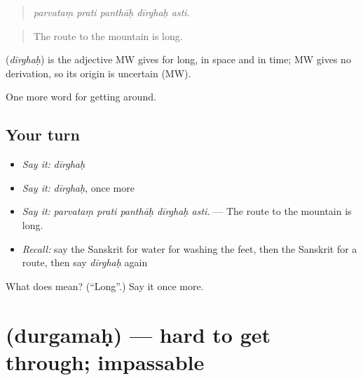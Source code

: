 \begin{quote}
    
\end{quote}

\begin{quote}
\emph{parvataṃ prati panthāḥ dīrghaḥ asti.}
\end{quote}

\begin{quote}
The route to the mountain is long.
\end{quote}

\begin{cousinweb}
\textbf{} (\emph{dīrghaḥ}) is the adjective MW gives for long, in space and in time; MW gives no derivation, so its origin is uncertain (MW).
\end{cousinweb}

\begin{grammarlens}[title={What you've built}]
One more word for getting around.
\end{grammarlens}

\subsection*{Your turn}
\begin{itemize}
\raggedright
  \item \emph{Say it:} \emph{dīrghaḥ}
  \item \emph{Say it:} \emph{dīrghaḥ}, once more
  \item \emph{Say it:} \emph{parvataṃ prati panthāḥ dīrghaḥ asti.} — The route to the mountain is long.
  \item \emph{Recall:} say the Sanskrit for water for washing the feet, then the Sanskrit for a route, then say \emph{dīrghaḥ} again
\end{itemize}

\begin{tcolorbox}[breakable,colback=teal!4,colframe=teal!35!black,title={Before you move on}]
What does  mean? (\textquotedblleft{}Long\textquotedblright{}.) Say it once more.
\end{tcolorbox}
\section[\texorpdfstring{\sk{दुर्गमः} (durgamaḥ)}{दुर्गमः (durgamaḥ)}]{ (durgamaḥ) — hard to get through; impassable}

\label{lesson:SA-C403-durgamah}



